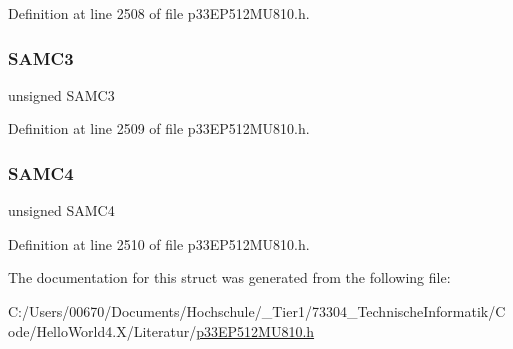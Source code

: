 Definition at line 2508 of file p33\+E\+P512\+M\+U810.\+h.

\mbox{\label{structtag_a_d1_c_o_n3_b_i_t_s_a15086a4b474d7cfc569c16b62b95a82d}} 
\subsubsection{\texorpdfstring{S\+A\+M\+C3}{SAMC3}}
{\footnotesize\ttfamily unsigned S\+A\+M\+C3}



Definition at line 2509 of file p33\+E\+P512\+M\+U810.\+h.

\mbox{\label{structtag_a_d1_c_o_n3_b_i_t_s_a3bc46ad0a1f495c6419955fb68aafe49}} 
\subsubsection{\texorpdfstring{S\+A\+M\+C4}{SAMC4}}
{\footnotesize\ttfamily unsigned S\+A\+M\+C4}



Definition at line 2510 of file p33\+E\+P512\+M\+U810.\+h.



The documentation for this struct was generated from the following file\+:\begin{DoxyCompactItemize}
\item 
C\+:/\+Users/00670/\+Documents/\+Hochschule/\+\_\+\+Tier1/73304\+\_\+\+Technische\+Informatik/\+Code/\+Hello\+World4.\+X/\+Literatur/\hyperlink{p33_e_p512_m_u810_8h}{p33\+E\+P512\+M\+U810.\+h}\end{DoxyCompactItemize}
